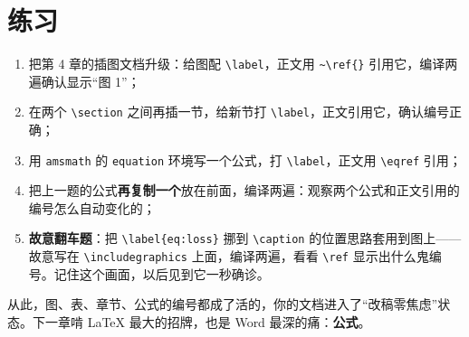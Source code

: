 \section*{练习}

\begin{enumerate}
\setlength{\itemsep}{2pt}
\item 把第 4 章的插图文档升级：给图配 \texttt{\textbackslash{}label}，正文用 \texttt{\textasciitilde{}\textbackslash{}ref\{\}} 引用它，编译两遍确认显示“图 1”；
\item 在两个 \texttt{\textbackslash{}section} 之间再插一节，给新节打 \texttt{\textbackslash{}label}，正文引用它，确认编号正确；
\item 用 \texttt{amsmath} 的 \texttt{equation} 环境写一个公式，打 \texttt{\textbackslash{}label}，正文用 \texttt{\textbackslash{}eqref} 引用；
\item 把上一题的公式\textbf{再复制一个}放在前面，编译两遍：观察两个公式和正文引用的编号怎么自动变化的；
\item \textbf{故意翻车题}：把 \texttt{\textbackslash{}label\{eq:loss\}} 挪到 \texttt{\textbackslash{}caption} 的位置思路套用到图上——故意写在 \texttt{\textbackslash{}includegraphics} 上面，编译两遍，看看 \texttt{\textbackslash{}ref} 显示出什么鬼编号。记住这个画面，以后见到它一秒确诊。
\end{enumerate}

从此，图、表、章节、公式的编号都成了活的，你的文档进入了“改稿零焦虑”状态。下一章啃 LaTeX 最大的招牌，也是 Word 最深的痛：\textbf{公式}。
